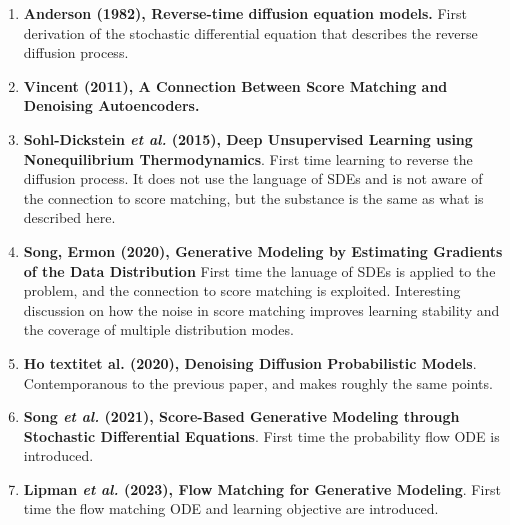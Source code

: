 \documentclass[10pt,letterpaper]{article}
\begin{document}
\begin{enumerate}
    \item \textbf{Anderson (1982), Reverse-time diffusion equation models.}
        First derivation of the stochastic differential equation that describes
        the reverse diffusion process.
    \item \textbf{Vincent (2011), A Connection Between Score Matching and
        Denoising Autoencoders.}
    \item \textbf{Sohl-Dickstein \textit{et al.} (2015), Deep Unsupervised
        Learning using Nonequilibrium Thermodynamics}. First time learning to
        reverse the diffusion process. It does not use the language of SDEs and
        is not aware of the connection to score matching, but the substance is
        the same as what is described here.
    \item \textbf{Song, Ermon (2020), Generative Modeling by Estimating
        Gradients of the Data Distribution} First time the lanuage of SDEs is
        applied to the problem, and the connection to score matching is
        exploited. Interesting discussion on how the noise in score matching
        improves learning stability and the coverage of multiple distribution
        modes.
   \item \textbf{Ho textit{et al.} (2020), Denoising Diffusion Probabilistic
       Models}. Contemporanous to the previous paper, and makes roughly the
        same points.
   \item \textbf{Song \textit{et al.} (2021), Score-Based Generative Modeling
       through Stochastic Differential Equations}. First time the probability
        flow ODE is introduced.
   \item \textbf{Lipman \textit{et al.} (2023), Flow Matching for Generative
       Modeling}. First time the flow matching ODE and learning objective are
        introduced.
\end{enumerate}
\end{document}
